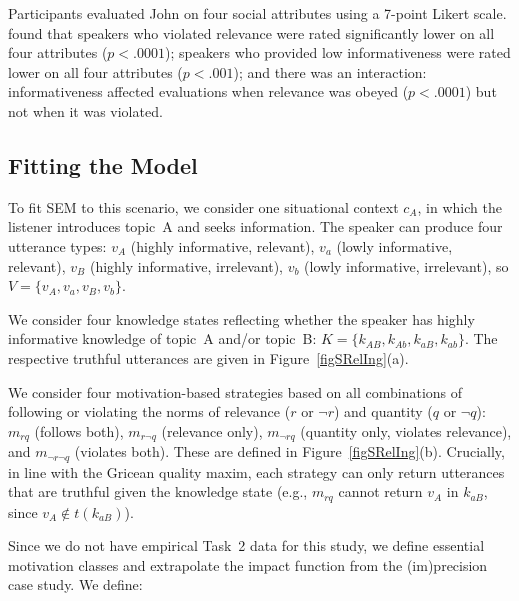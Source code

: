 \documentclass[12pt,a4paper]{article}
\begin{document}
Participants evaluated John on four social attributes using a 7-point Likert
scale. \citet{beltramapapafragou2023} found that speakers who violated relevance
were rated significantly lower on all four attributes ($p < .0001$); speakers
who provided low informativeness were rated lower on all four attributes
($p < .001$); and there was an interaction: informativeness affected evaluations
when relevance was obeyed ($p < .0001$) but not when it was violated.


\subsection{Fitting the Model}

To fit SEM to this scenario, we consider one situational context $c_A$, in which
the listener introduces topic~A and seeks information. The speaker can produce
four utterance types: $v_A$ (highly informative, relevant), $v_a$ (lowly
informative, relevant), $v_B$ (highly informative, irrelevant), $v_b$ (lowly
informative, irrelevant), so $V = \{v_A, v_a, v_B, v_b\}$.

We consider four knowledge states reflecting whether the speaker has highly
informative knowledge of topic~A and/or topic~B: $K = \{k_{AB}, k_{Ab}, k_{aB},
k_{ab}\}$. The respective truthful utterances are given in Figure~\ref{figSRelIng}(a).

We consider four motivation-based strategies based on all combinations of
following or violating the norms of relevance ($r$ or $\neg r$) and quantity
($q$ or $\neg q$): $m_{rq}$ (follows both), $m_{r\neg q}$ (relevance only),
$m_{\neg rq}$ (quantity only, violates relevance), and $m_{\neg r\neg q}$
(violates both). These are defined in Figure~\ref{figSRelIng}(b). Crucially, in
line with the Gricean quality maxim, each strategy can only return utterances
that are truthful given the knowledge state (e.g., $m_{rq}$ cannot return $v_A$
in $k_{aB}$, since $v_A \notin t(k_{aB})$).

Since we do not have empirical Task~2 data for this study, we define essential
motivation classes and extrapolate the impact function from the (im)precision
case study. We define:
\end{document}
